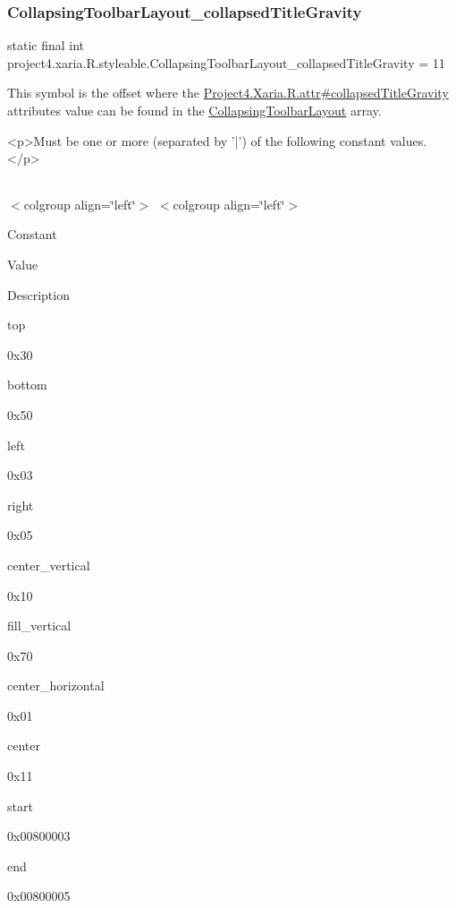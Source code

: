 \subsubsection{\texorpdfstring{Collapsing\+Toolbar\+Layout\+\_\+collapsed\+Title\+Gravity}{CollapsingToolbarLayout\_collapsedTitleGravity}}
{\footnotesize\ttfamily static final int project4.\+xaria.\+R.\+styleable.\+Collapsing\+Toolbar\+Layout\+\_\+collapsed\+Title\+Gravity = 11\hspace{0.3cm}{\ttfamily [static]}}

This symbol is the offset where the \hyperlink{}{Project4.\+Xaria.\+R.\+attr\#collapsed\+Title\+Gravity} attribute\textquotesingle{}s value can be found in the \hyperlink{classproject4_1_1xaria_1_1R_1_1styleable_ac131ed2b7e0e7f05b58231242478b839}{Collapsing\+Toolbar\+Layout} array.

\begin{DoxyVerb}      <p>Must be one or more (separated by '|') of the following constant values.</p>
\end{DoxyVerb}
 \tabulinesep=1mm
\begin{longtabu} spread 0pt [c]{*{0}{|X[-1]}|}
\hline
\end{longtabu}
$<$colgroup align=\char`\"{}left\char`\"{}$>$ $<$colgroup align=\char`\"{}left\char`\"{}$>$ 

Constant

Value

Description 

{\ttfamily top}

0x30

{\ttfamily bottom}

0x50

{\ttfamily left}

0x03

{\ttfamily right}

0x05

{\ttfamily center\+\_\+vertical}

0x10

{\ttfamily fill\+\_\+vertical}

0x70

{\ttfamily center\+\_\+horizontal}

0x01

{\ttfamily center}

0x11

{\ttfamily start}

0x00800003

{\ttfamily end}

0x00800005

